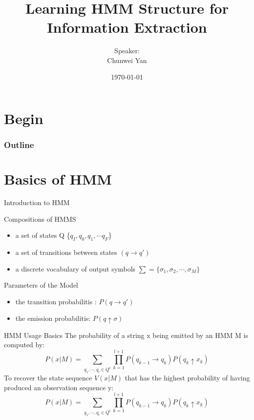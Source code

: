 \documentclass{beamer}
\title{Learning HMM Structure for Information Extraction}
\author{Speaker:\\Chunwei Yan}
\institute[PKUSZ]{
    互联网研发中心\\
}
\date{\today}
\begin{document}
\begin{frame}
  \titlepage
\end{frame}

\section{Begin}
\begin{frame}
\frametitle{Outline}
\tableofcontents
\end{frame}

\section{Basics of HMM}
\begin{frame}{Introduction to HMM}
\begin{block}{Compositions of HMMS }
    \begin{itemize}
        \item a set of states Q \{$q_I, q_0, q_1, \cdots q_F$\}
        \item a set of transitions between states $(q \rightarrow q')$
        \item a discrete vocabulary of output symbols $\sum = \{ \sigma_1, \sigma_2, \cdots, \sigma_M\}$
    \end{itemize}
\end{block}

\begin{block}{Parameters of the Model}
\begin{itemize}
    \item the transition probabilitis : $P(q \rightarrow q')$
    \item the emission probabilitis: $P(q \uparrow \sigma)$ 
\end{itemize}
\end{block}
\end{frame}

\begin{frame}{HMM Usage Basics}
    The probability of a string x being emitted by an HMM M is computed by:
    \begin{equation}
    P(x|M) = \sum_{q_1,\cdots,q_l \in Q^t} {
        \prod_{k=1}^{l+1}{
            P(q_{k-1} \rightarrow q_k) P(q_k \uparrow x_k)
        }
    }
    \end{equation}
    To recover the state sequence $V(x|M)$ that has the highest probability of having produced an observation sequence y:
    \begin{equation}
    P(x|M) = \sum_{q_1,\cdots,q_l \in Q^t} {
        \prod_{k=1}^{l+1}{
            P(q_{k-1} \rightarrow q_k) P(q_k \uparrow x_k)
        }
    }
    \end{equation}
\end{frame}
\end{document}
